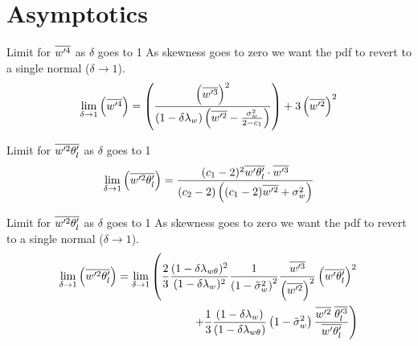\documentclass[10pt]{beamer}
\numberwithin{equation}{section}
\begin{document}
    \section{Asymptotics}\label{sec:asymptotics}

    \begin{frame}{Limit for \texorpdfstring{$\overline{w'^4}$}{wprime4bar} as \texorpdfstring{$\delta$}{delta} goes to 1}
        As skewness goes to zero we want the pdf to revert to a single normal ($\delta \to 1$).
        \begin{align}
            \label{eq:limit_wprime4_delta_to_1}
            \lim_{\delta \to 1}\left(\overline{w'^4}\right)
            = \left(
            \frac{
                \left(\overline{w'^3}\right)^2
            }{
                (1 - \delta\lambda_w)
                \left(\overline{w'^2} - \frac{\sigma_w^2}{2 - c_1}\right)
            }
            \right)
            + 3 \left(\overline{w'^2}\right)^2
        \end{align}
    \end{frame}

    \begin{frame}{Limit for \texorpdfstring{$\overline{w'^2 \theta_l'}$}{wprime2thetalbar} as \texorpdfstring{$\delta$}{delta} goes to 1}
        \begin{align}
            \label{eq:limit_wprime2thetalbar_delta_to_1}
            \lim_{\delta \to 1}\left(\overline{w'^2 \theta_l'}\right)
            = \frac{(c_1 - 2)^2 \overline{w' \theta_l'} \cdot \overline{w'^3}}{(c_2 - 2)\left((c_1 - 2)\overline{w'^2} + \sigma_w^2\right)}
        \end{align}
    \end{frame}

    \begin{frame}{Limit for \texorpdfstring{$\overline{w'^2 \theta_l'}$}{wprimethetaltwobar} as \texorpdfstring{$\delta$}{delta} goes to 1}
        As skewness goes to zero we want the pdf to revert to a single normal ($\delta \to 1$).
        \begin{align}
            \label{eq:limit_wprimethetalprime2bar_delta_to_1}
            \lim_{\delta \to 1}\left(\overline{w'^2 \theta_l'}\right)
            = \lim_{\delta \to 1}
            \left(
            \frac{2}{3}
            \frac{(1-\delta \lambda_{w \theta})^2}{(1-\delta \lambda_w)^2}
            \frac{1}{\left( 1 - \tilde{\sigma}_w^2 \right)^2}
            \frac{\overline{w'^3}}{\left(\overline{w'^2} \right)^2}
            \left(\overline{w' \theta_l'} \right)^2
            \right.
            \nonumber\\
            \left.
            +
            \frac{1}{3}
            \frac{(1-\delta \lambda_w)}{(1-\delta \lambda_{w \theta})}
            \left( 1 - \tilde{\sigma}_w^2 \right)
            \frac{\overline{w'^2} \; \overline{\theta_l'^3}}{\overline{w' \theta_l'}}
            \right)
        \end{align}
    \end{frame}
\end{document}
